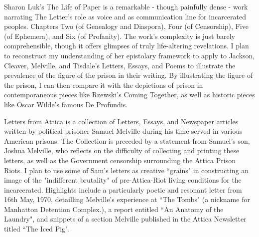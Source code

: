\documentclass[14pt, letterpaper]{article}
\begin{document}
\clearpage


\begin{adjustwidth}{2.5ex}{0pt}

	Sharon Luk's The Life of Paper is a remarkable - though painfully dense - 
	work narrating The Letter's role as voice and as communication line for 
	incarcerated peoples. Chapters Two (of Genealogy and Diaspora), Four 
	(of Censorship), Five (of Ephemera), and Six (of Profanity). The work's 
	complexity is just barely comprehensible, though it offers glimpses of 
	truly life-altering revelations. I plan to reconstruct my understanding of 
	her epistolary framework to apply to Jackson, Cleaver, Melville, and 
	Tisdale's Letters, Essays, and Poems to illustrate the prevalence of the 
	figure of the prison in their writing. By illustrating the figure of the 
	prison, I can then compare it with the depictions of prison in 
	contemporaneous pieces like Rzewski's Coming Together, as well as historic 
	pieces like Oscar Wilde's famous De Profundis. 

\end{adjustwidth}

\clearpage


\begin{adjustwidth}{2.5em}{0pt}

	Letters from Attica is a collection of Letters, Essays, and 
	Newspaper articles written by political prisoner Samuel Melville 
	during his time served in various American prisons. The Collection 
	is preceded by a statement from Samuel's son, Joshua Melville, 
	who reflects on the difficulty of collecting and printing 
	these letters, as well as the Government censorship surrounding 
	the Attica Prison Riots. I plan to use some of Sam's letters as 
	creative ``grains" in constructing an image of the "indifferent 
	brutality" of pre-Attica-Riot living conditions for the incarcerated.
	Highlights include a particularly poetic and resonant letter from 
	16th May, 1970,  detailling Melville's experience at ``The Tombs" 
	(a nickname for Manhatton Detention Complex.), a report entitled 
	``An Anatomy of the Laundry", and snippets of a section Melville 
	published in the Attica Newsletter titled ``The Iced Pig". 

\end{adjustwidth}

\clearpage

\end{document}
